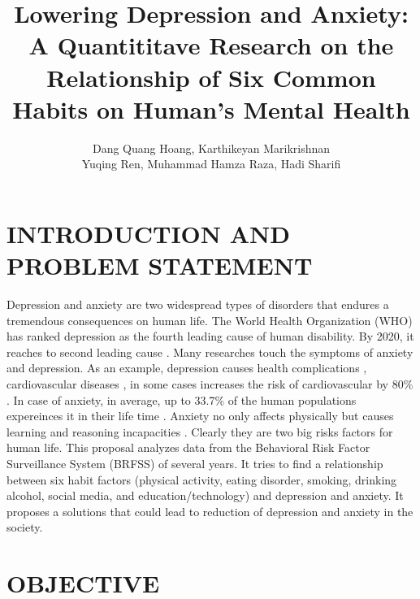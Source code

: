 \documentclass[letterpaper, 10 pt, conference]{ieeeconf}  %
\title{\LARGE \bf
Lowering Depression and Anxiety: A Quantititave Research on the Relationship of Six Common Habits 
on Human's Mental Health
}
\author{Dang Quang Hoang, Karthikeyan Marikrishnan \\ Yuqing Ren, Muhammad Hamza Raza, Hadi Sharifi}
\begin{document}
\maketitle
\thispagestyle{empty}
\pagestyle{empty}






\section{INTRODUCTION AND PROBLEM STATEMENT}
Depression and anxiety are two widespread types of disorders that endures a tremendous consequences on human life.  
The World Health Organization (WHO) has ranked depression as the fourth leading cause of human disability.
By 2020, it reaches to second leading cause \cite{kessler2013epidemiology}. Many researches touch the symptoms of anxiety and depression.
As an example, depression causes health 
complications \cite{verma2017impact}, cardiovascular diseases \cite{bradley2015depression}, in some cases increases 
the risk of cardiovascular by 80\% \cite{penninx2017depression}. In case of anxiety, in average, up to 33.7\% of 
the human populations expereinces it in their life time \cite{bandelow2015epidemiology}. Anxiety no only affects physically
but causes learning and reasoning incapacities \cite{spielberger2013effects}\cite{darke1988effects}. 
Clearly they are two big risks factors for human life.
This proposal analyzes data from the Behavioral Risk Factor Surveillance System (BRFSS) of several years. 
It tries to find a relationship between six habit factors (physical activity, eating disorder, 
smoking, drinking alcohol, social media, and education/technology) and depression and anxiety. It proposes a
solutions that could lead to reduction of depression and anxiety in the society. 

\section{OBJECTIVE}
\end{document}
